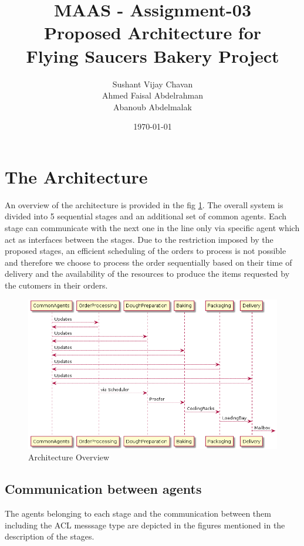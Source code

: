 \documentclass[11pt, a4paper]{article}
\title{MAAS - Assignment-03\\
Proposed Architecture for \\Flying Saucers Bakery Project}
\author{Sushant Vijay Chavan\\Ahmed Faisal Abdelrahman\\Abanoub Abdelmalak}
\date{\today}
\begin{document}
\maketitle
\newpage
\newpage

\section{The Architecture}
An overview of the architecture is provided in the fig \ref{architecture_overview}. The overall system is divided into 5 sequential stages and an additional set of common agents. Each stage can communicate with the next one in the line only via specific agent which act as interfaces between the stages. Due to the restriction imposed by the proposed stages, an efficient scheduling of the orders to process is not possible and therefore we choose to process the order sequentially based on their time of delivery and the availability of the resources to produce the items requested by the cutomers in their orders.

\begin{figure}[h!]
	\centering
	\includegraphics[scale=0.5]{../Architecture/Architecture_Stages.png}
	\caption{Architecture Overview}
	\label{architecture_overview}
\end{figure}

\pagebreak
\subsection{Communication between agents}
The agents belonging to each stage and the communication between them including the ACL messsage type are depicted in the figures mentioned in the description of the stages.
\end{document}
